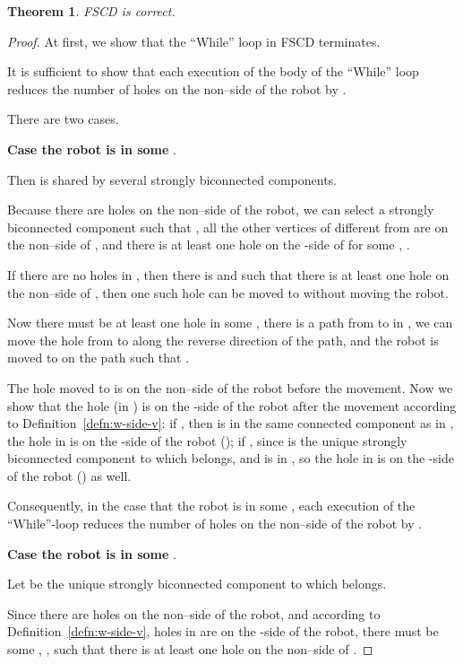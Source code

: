 \documentclass{article}
\newtheorem{thm}{Theorem}
\begin{document}
\begin{thm}
FSCD is correct.
\end{thm}
\begin{proof}

At first, we show that the ``While'' loop in FSCD terminates.

It is sufficient to show that each execution of the body of the
``While'' loop reduces the number of holes on the non--side of
the robot by .

There are two cases.

\textbf{Case the robot is in some }.

Then  is shared by several strongly biconnected components.

Because there are holes on the non--side of the robot, we can
select a strongly biconnected component  such that ,
all the other vertices of  different from  are on the
non--side of , and there is at least one hole on the -side
of  for some , .

If there are no holes in , then there is  and
 such that there is at least one hole on the
non--side of , then one such hole can be moved to
 without moving the robot.

Now there must be at least one hole in some ,
there is a path from  to  in , we can move the hole
from  to  along the reverse direction of the path, and
the robot is moved to  on the path such that
.

The hole moved to  is on the non--side of the robot before the
movement. Now we show that the hole (in ) is on the -side of
the robot after the movement according to
Definition~\ref{defn:w-side-v}: if ,
then  is in the same connected component as  in
, the hole in  is on the
-side of the robot (); if , since  is the unique strongly biconnected
component to which  belongs, and  is in , so
the hole in  is on the -side of the robot () as
well.

Consequently, in the case that the robot is in some ,
each execution of the ``While''-loop reduces the number of holes on
the non--side of the robot by .

\textbf{Case the robot is in some }.

Let  be the unique strongly biconnected component to which 
belongs.

Since there are holes on the non--side of the robot, and
according to Definition~\ref{defn:w-side-v}, holes in  are on the
-side of the robot, there must be some , ,
 such that there is at least one hole on the
non--side of .


\end{proof}
\end{document}
